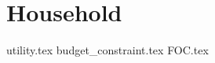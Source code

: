 \documentclass[12pt]{article}
\begin{document}
\section{Household}
{utility.tex}
{budget_constraint.tex}
\pagebreak
{FOC.tex}
\end{document}
